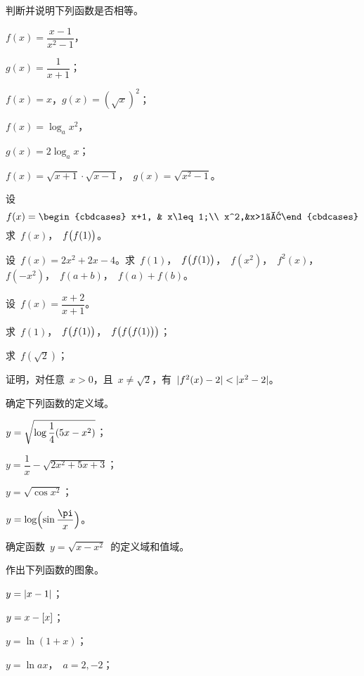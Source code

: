 \begin{exercise}
\item 判断并说明下列函数是否相等。
\begin{exlistcols}[4]
  \item $f(x)=\dfrac{x-1}{x^2-1}$，
  \item[]$g(x)=\dfrac1{x+1}$；
  \item $f(x)=x$，\quad $g(x)=(\sqrt x)^2$；
  \item $f(x)=\log_ax^2$，
  \item[]$g(x)=2\log_ax$；
  \item $f(x)=\sqrt{x+1}\cdot\sqrt{x-1}$，~$g(x)=\sqrt{x^2-1}$。
\end{exlistcols}
\item 设
\[
  f(x)=\begin{cbdcases}
  x+1, & x\leq 1;\\
  x^2,&x>1。\end{cbdcases}
\]
求~$f(x)$，~$f\Parenb{f(1)}$。
\item 设~$f(x)=2x^2+2x-4$。求~$f(1)$，~$f\Parenb{f(1)}$，~$f(x^2)$，~$f^2(x)$，~$f(-x^2)$，~$f(a+b)$，~$f(a)+f(b)$。
\item 设~$f(x)=\dfrac{x+2}{x+1}$。
\begin{exlistcols}
  \item 求~$f(1)$，~$f\Parenb{f(1)}$，~$f\Parenb{f\Parenb{f(1)}}$；
  \item 求~$f(\sqrt2)$；
  \item 证明，对任意~$x>0$，且~$x\neq\sqrt2$，有~$\abs{f^2(x)-2}<\abs{x^2-2}$。
\end{exlistcols}
\item 确定下列函数的定义域。
\begin{exlistcols}
  \item $y=\sqrt{\ln\dfrac1{\smash[b]{4}}(5x-x^2)}$；
  \item $y=\dfrac1x-\sqrt{2x^2+5x+3}$；
  \item $y=\sqrt{\cos x^2}$；
  \item $y=\ln\Paren[\Big]{\sin\dfrac\pi x}$。
\end{exlistcols}
\item 确定函数~$y=\sqrt{x-x^2}$~的定义域和值域。
\item 作出下列函数的图象。
\begin{exlistcols}[3]
  \item $y=\abs{x-1}$；
  \item $y=x-\Floor x$；
  \item $y=\ln(1+x)$；
  \item $y=\ln ax$，~$a=2,-2$；

\end{exlistcols}
\end{exercise}
